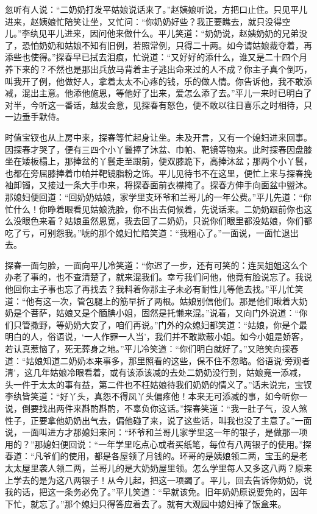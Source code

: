 忽听有人说：``二奶奶打发平姑娘说话来了。''赵姨娘听说，方把口止住。只见平儿进来，赵姨娘忙陪笑让坐，又忙问：``你奶奶好些？我正要瞧去，就只没得空儿。''李纨见平儿进来，因问他来做什么。平儿笑道：``奶奶说，赵姨奶奶的兄弟没了，恐怕奶奶和姑娘不知有旧例，若照常例，只得二十两。如今请姑娘裁夺着，再添些也使得。''探春早已拭去泪痕，忙说道：``又好好的添什么，谁又是二十四个月养下来的？不然也是那出兵放马背着主子逃出命来过的人不成？你主子真个倒巧，叫我开了例，他做好人，拿着太太不心疼的钱，乐的做人情。你告诉他，我不敢添减，混出主意。他添他施恩，等他好了出来，爱怎么添了去。''平儿一来时已明白了对半，今听这一番话，越发会意，见探春有怒色，便不敢以往日喜乐之时相待，只一边垂手默侍。

时值宝钗也从上房中来，探春等忙起身让坐。未及开言，又有一个媳妇进来回事。因探春才哭了，便有三四个小丫鬟捧了沐盆、巾帕、靶镜等物来。此时探春因盘膝坐在矮板榻上，那捧盆的丫鬟走至跟前，便双膝跪下，高捧沐盆；那两个小丫鬟，也都在旁屈膝捧着巾帕并靶镜脂粉之饰。平儿见待书不在这里，便忙上来与探春挽袖卸镯，又接过一条大手巾来，将探春面前衣襟掩了。探春方伸手向面盆中盥沐。那媳妇便回道：``回奶奶姑娘，家学里支环爷和兰哥儿的一年公费。''平儿先道：``你忙什么！你睁着眼看见姑娘洗脸，你不出去伺候着，先说话来。二奶奶跟前你也这么没眼色来着？姑娘虽然恩宽，我去回了二奶奶，只说你们眼里都没姑娘，你们都吃了亏，可别怨我。''唬的那个媳妇忙陪笑道：``我粗心了。''一面说，一面忙退出去。

探春一面匀脸，一面向平儿冷笑道：``你迟了一步，还有可笑的：连吴姐姐这么个办老了事的，也不查清楚了，就来混我们。幸亏我们问他，他竟有脸说忘了。我说他回你主子事也忘了再找去？我料着你那主子未必有耐性儿等他去找。''平儿忙笑道：``他有这一次，管包腿上的筋早折了两根。姑娘别信他们。那是他们瞅着大奶奶是个菩萨，姑娘又是个腼腆小姐，固然是托懒来混。''说着，又向门外说道：``你们只管撒野，等奶奶大安了，咱们再说。''门外的众媳妇都笑道：``姑娘，你是个最明白的人，俗语说，`一人作罪一人当'，我们并不敢欺蔽小姐。如今小姐是娇客，若认真惹恼了，死无葬身之地。''平儿冷笑道：``你们明白就好了。''又陪笑向探春道：``姑娘知道二奶奶本来事多，那里照看的这些，保不住不忽略。俗语说`旁观者清'，这几年姑娘冷眼看着，或有该添该减的去处二奶奶没行到，姑娘竟一添减，头一件于太太的事有益，第二件也不枉姑娘待我们奶奶的情义了。''话未说完，宝钗李纨皆笑道：``好丫头，真怨不得凤丫头偏疼他！本来无可添减的事，如今听你一说，倒要找出两件来斟酌斟酌，不辜负你这话。''探春笑道：``我一肚子气，没人煞性子，正要拿他奶奶出气去，偏他碰了来，说了这些话，叫我也没了主意了。''一面说，一面叫进方才那媳妇来问：``环爷和兰哥儿家学里这一年的银子，是做那一项用的？''那媳妇便回说：``一年学里吃点心或者买纸笔，每位有八两银子的使用。''探春道：``凡爷们的使用，都是各屋领了月钱的。环哥的是姨娘领二两，宝玉的是老太太屋里袭人领二两，兰哥儿的是大奶奶屋里领。怎么学里每人又多这八两？原来上学去的是为这八两银子！从今儿起，把这一项蠲了。平儿，回去告诉你奶奶，说我的话，把这一条务必免了。''平儿笑道：``早就该免。旧年奶奶原说要免的，因年下忙，就忘了。''那个媳妇只得答应着去了。就有大观园中媳妇捧了饭盒来。

